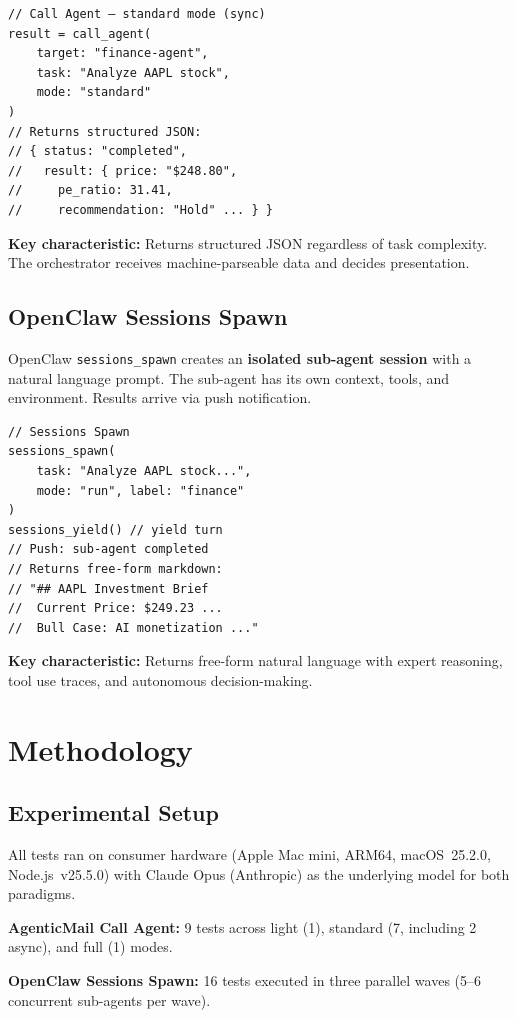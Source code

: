 \documentclass[11pt,twocolumn]{article}
\begin{document}
\begin{lstlisting}
// Call Agent — standard mode (sync)
result = call_agent(
    target: "finance-agent",
    task: "Analyze AAPL stock",
    mode: "standard"
)
// Returns structured JSON:
// { status: "completed",
//   result: { price: "$248.80",
//     pe_ratio: 31.41,
//     recommendation: "Hold" ... } }
\end{lstlisting}

\textbf{Key characteristic:} Returns structured JSON regardless of task complexity. The orchestrator receives machine-parseable data and decides presentation.

\subsection{OpenClaw Sessions Spawn}

OpenClaw \texttt{sessions\_spawn} creates an \textbf{isolated sub-agent session} with a natural language prompt. The sub-agent has its own context, tools, and environment. Results arrive via push notification.

\begin{lstlisting}
// Sessions Spawn
sessions_spawn(
    task: "Analyze AAPL stock...",
    mode: "run", label: "finance"
)
sessions_yield() // yield turn
// Push: sub-agent completed
// Returns free-form markdown:
// "## AAPL Investment Brief
//  Current Price: $249.23 ...
//  Bull Case: AI monetization ..."
\end{lstlisting}

\textbf{Key characteristic:} Returns free-form natural language with expert reasoning, tool use traces, and autonomous decision-making.

\section{Methodology}

\subsection{Experimental Setup}

All tests ran on consumer hardware (Apple Mac mini, ARM64, macOS~25.2.0, Node.js~v25.5.0) with Claude Opus (Anthropic) as the underlying model for both paradigms.

\textbf{AgenticMail Call Agent:} 9 tests across light (1), standard (7, including 2 async), and full (1) modes.

\textbf{OpenClaw Sessions Spawn:} 16 tests executed in three parallel waves (5--6 concurrent sub-agents per wave).
\end{document}
